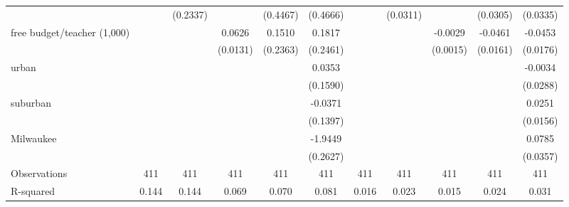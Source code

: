 {\begin{tabular}{l*{10}{c}}
                    &                     &    (0.2337)         &                     &    (0.4467)         &    (0.4666)         &                     &    (0.0311)         &                     &    (0.0305)         &    (0.0335)         \\
[1em]
free budget/teacher (1,000)&                     &                     &      0.0626\sym{***}&      0.1510         &      0.1817         &                     &                     &     -0.0029\sym{*}  &     -0.0461\sym{***}&     -0.0453\sym{**} \\
                    &                     &                     &    (0.0131)         &    (0.2363)         &    (0.2461)         &                     &                     &    (0.0015)         &    (0.0161)         &    (0.0176)         \\
[1em]
urban               &                     &                     &                     &                     &      0.0353         &                     &                     &                     &                     &     -0.0034         \\
                    &                     &                     &                     &                     &    (0.1590)         &                     &                     &                     &                     &    (0.0288)         \\
[1em]
suburban            &                     &                     &                     &                     &     -0.0371         &                     &                     &                     &                     &      0.0251         \\
                    &                     &                     &                     &                     &    (0.1397)         &                     &                     &                     &                     &    (0.0156)         \\
[1em]
Milwaukee           &                     &                     &                     &                     &     -1.9449\sym{***}&                     &                     &                     &                     &      0.0785\sym{**} \\
                    &                     &                     &                     &                     &    (0.2627)         &                     &                     &                     &                     &    (0.0357)         \\
\hline
Observations        &         411         &         411         &         411         &         411         &         411         &         411         &         411         &         411         &         411         &         411         \\
R-squared           &       0.144         &       0.144         &       0.069         &       0.070         &       0.081         &       0.016         &       0.023         &       0.015         &       0.024         &       0.031         \\
\hline\hline
\end{tabular}
}
